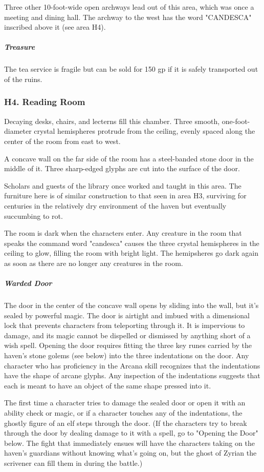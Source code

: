 \documentclass[10pt,a4paper,twoside,bg=print,twocolumn,openany,nodeprecatedcode]{dndbook}
\begin{document}
Three other 10-foot-wide open archways lead out of this area, which was once a meeting and dining hall. The archway to the west has the word "CANDESCA" inscribed above it (see area H4).

\subparagraph{Treasure}
The tea service is fragile but can be sold for 150 gp if it is safely transported out of the ruins.

\subsubsection{H4. Reading Room}
\begin{DndReadAloud}{}
Decaying desks, chairs, and lecterns fill this chamber. Three smooth, one-foot-diameter crystal hemispheres protrude from the ceiling, evenly spaced along the center of the room from east to west.

A concave wall on the far side of the room has a steel-banded stone door in the middle of it. Three sharp-edged glyphs are cut into the surface of the door.

\end{DndReadAloud}

Scholars and guests of the library once worked and taught in this area. The furniture here is of similar construction to that seen in area H3, surviving for centuries in the relatively dry environment of the haven but eventually succumbing to rot.

The room is dark when the characters enter. Any creature in the room that speaks the command word "candesca" causes the three crystal hemispheres in the ceiling to glow, filling the room with bright light. The hemipsheres go dark again as soon as there are no longer any creatures in the room.

\subparagraph{Warded Door}
The door in the center of the concave wall opens by sliding into the wall, but it's sealed by powerful magic. The door is airtight and imbued with a dimensional lock that prevents characters from teleporting through it. It is impervious to damage, and its magic cannot be dispelled or dismissed by anything short of a wish spell. Opening the door requires fitting the three key runes carried by the haven's stone golems (see below) into the three indentations on the door. Any character who has proficiency in the Arcana skill recognizes that the indentations have the shape of arcane glyphs. Any inspection of the indentations suggests that each is meant to have an object of the same shape pressed into it.

The first time a character tries to damage the sealed door or open it with an ability check or magic, or if a character touches any of the indentations, the ghostly figure of an elf steps through the door. (If the characters try to break through the door by dealing damage to it with a spell, go to "Opening the Door" below. The fight that immediately ensues will have the characters taking on the haven's guardians without knowing what's going on, but the ghost of Zyrian the scrivener can fill them in during the battle.)
\end{document}
